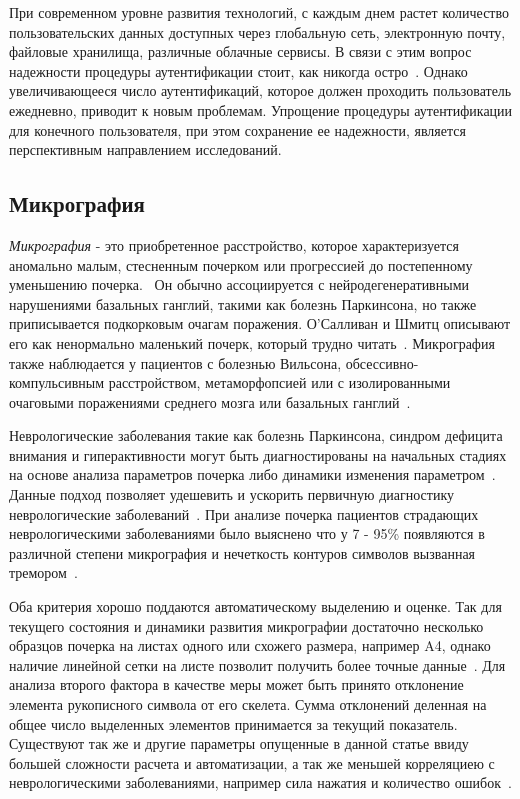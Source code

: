 При современном уровне развития технологий, с каждым днем растет количество пользовательских данных доступных через глобальную сеть, электронную почту, файловые хранилища, различные облачные сервисы. В связи с этим вопрос надежности процедуры аутентификации стоит, как никогда остро~\cite{vorona}. Однако увеличивающееся число аутентификаций, которое должен проходить пользователь ежедневно, приводит к новым проблемам. Упрощение процедуры аутентификации для конечного пользователя, при этом сохранение ее надежности, является перспективным направлением исследований.

\subsection{Микрография}
\emph{Микрография} - это приобретенное расстройство, которое характеризуется аномально малым, стесненным почерком или прогрессией до постепенному уменьшению почерка.~\cite[c.~221]{larner} Он обычно ассоциируется с нейродегенеративными нарушениями базальных ганглий, такими как болезнь Паркинсона, но также приписывается подкорковым очагам поражения. О'Салливан и Шмитц описывают его как ненормально маленький почерк, который трудно читать~\cite[с.~177]{metman_kompoliti}. Микрография также наблюдается у пациентов с болезнью Вильсона, обсессивно-компульсивным расстройством, метаморфопсией или с изолированными очаговыми поражениями среднего мозга или базальных ганглий~\cite{mavrogiorgou_mergl_tigges_husseini_schroter_juckel_zaudig_hegerl}.

Неврологические заболевания такие как болезнь Паркинсона, синдром дефицита внимания и гиперактивности могут быть диагностированы на начальных стадиях на основе анализа параметров почерка либо динамики изменения параметром~\cite{wiki_micrographia}. Данные подход позволяет удешевить и ускорить первичную диагностику неврологические заболеваний~\cite{mavrogiorgou_mergl_tigges_husseini_schroter_juckel_zaudig_hegerl}.
При анализе почерка пациентов страдающих неврологическими заболеваниями было выяснено что у 7 - 95\% появляются в различной степени микрография и нечеткость контуров символов вызванная тремором~\cite{mckhight}.

Оба критерия хорошо поддаются автоматическому выделению и оценке. Так для текущего состояния и динамики развития микрографии достаточно несколько образцов почерка на листах одного или схожего размера, например A4, однако наличие линейной сетки на листе позволит получить более точные данные~\cite{nervous_system_disorders}.
Для анализа второго фактора в качестве меры может быть принято отклонение элемента рукописного символа от его скелета. Сумма отклонений деленная на общее число выделенных элементов принимается за текущий показатель.
Существуют так же и другие параметры опущенные в данной статье ввиду большей сложности расчета и автоматизации, а так же меньшей корреляциею с неврологическими заболеваниями, например сила нажатия и количество ошибок~\cite{ziliotto_cersosimo_micheli}.

